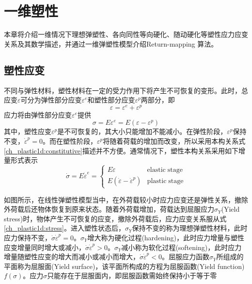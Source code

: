\chapter{一维塑性}
本章将介绍一维情况下理想弹塑性、各向同性等向硬化、随动硬化等塑性应力应变关系及其数学描述，并通过一维弹塑性模型介绍Return-mapping 算法。

\section{塑性应变}
不同与弹性材料，塑性材料在一定的受力作用下将产生不可恢复的变形。此时，总应变$\varepsilon$可分为弹性部分应变$\varepsilon^e$和塑性部分应变$\varepsilon^p$两部分，即
\begin{equation}
\varepsilon = \varepsilon^e + \varepsilon^p
\end{equation}
应力将由弹性部分应变$\varepsilon^e$提供
\begin{equation}\label{ch_plastic1d:constitutive}
\sigma = E\varepsilon^e = E(\varepsilon - \varepsilon^p)
\end{equation}
其中，塑性应变$\varepsilon^p$是不可恢复的，其大小只能增加不能减小。在弹性阶段，$\varepsilon^p$保持不变，$\dot \varepsilon^p=0$。而在塑性阶段，$\varepsilon^p$将随着荷载的增加而改变，所以采用本构关系式\eqref{ch_plastic1d:constitutive}描述并不方便。通常情况下，塑性本构关系采用如下增量形式表示
\begin{equation}\label{ch_plastic1d:stress}
\dot \sigma = E \dot \varepsilon^e =
\begin{cases}
    E\dot \varepsilon & \mathrm{elastic \; stage} \\
    E(\dot \varepsilon - \dot \varepsilon^p) & \mathrm{plastic \; stage}
\end{cases}
\end{equation} \par
如图所示，在线性弹塑性模型当中，在外荷载较小时应力应变还是弹性关系，撤除外荷载后还物体恢复到原来状态。随着外荷载增加，荷载达到屈服应力$\sigma_Y$(Yield stress)时，物体产生不可恢复的应变，撤除外荷载后，应力应变关系服从式\eqref{ch_plastic1d:stress}。进入塑性状态后，$\sigma_Y$保持不变的称为理想弹塑性材料，此时应力保持不变，$\dot \sigma \dot \varepsilon^p=0$。$\sigma_Y$增大称为硬化过程(hardening)，此时应力增量与塑性应变增量同时增大或减小，$\dot \sigma \dot \varepsilon^p>0$。$\sigma_Y$减小称为软化过程(softening)，此时应力增量随塑性应变的增大而减小或减小而增大，$\dot \sigma \dot \varepsilon^p<0$。屈服应力函数$\sigma_Y$所组成的平面称为屈服面(Yield surface)，该平面所构成的方程为屈服函数(Yield function)$f(\sigma)$。应力$\sigma$只能存在于屈服面内，即屈服函数需始终保持小于等于零
